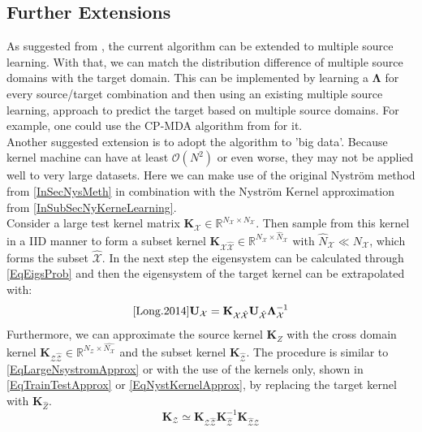 \subsection{Further Extensions}\label{InSubSecFExt}
As suggested from \cite{Long.2015}, the current algorithm can be extended to multiple source learning.
With that, we can match the distribution difference of multiple source domains with the target domain.
This can be implemented by learning a $\mathbf{\Lambda}$ for every source/target combination and then using an existing multiple source learning, approach to predict the target based on multiple source domains.
For example, one could use the \ac{CP-MDA} algorithm from \cite{Chattopadhyay.2012} for it.\\
Another suggested extension is to adopt the algorithm to 'big data'.
Because kernel machine can have at least $\mathcal{O}(N^2)$ or even worse, they may not be applied well to very large datasets.
Here we can make use of the original Nyström method from \ref{InSecNysMeth} in combination with the Nyström Kernel approximation from \ref{InSubSecNyKerneLearning}.\cite{Long.2015}\\
Consider a large test kernel matrix $\mathbf{K}_\mathcal{X} \in \mathbb{R}^{N_\mathcal{X}\times N_\mathcal{X}}$.
Then sample from this kernel in a \acs{IID} manner to form a subset kernel $\mathbf{K}_\mathcal{X\hat{X}} \in \mathbb{R}^{N_\mathcal{X}\times \hat{N}_\mathcal{X}}$ with $\hat{N}_\mathcal{X} \ll N_\mathcal{X}$, which forms the subset $\mathcal{\hat{X}}$.
In the next step the eigensystem can be calculated through \eqref{EqEigsProb} and then the eigensystem of the target kernel can be extrapolated with:
\begin{equation}\label{EqLargeNsystromApprox}\cite{Long.2014}
	\mathbf{U}_\mathcal{X}=\mathbf{K}_\mathcal{X\hat{X}}\mathbf{U}_\mathcal{\hat{X}}\mathbf{\Lambda}_\mathcal{X}^{-1}
\end{equation}
Furthermore, we can approximate the source kernel $\mathbf{K}_{Z}$ with the  cross domain kernel $\mathbf{K}_{\mathcal{Z\hat{Z}}} \in \mathbb{R}^{N_\mathcal{Z}\times \hat{N_\mathcal{X}}}$ and the subset kernel $\mathbf{K}_\mathcal{\hat{Z}}$.
The procedure is similar to \eqref{EqLargeNsystromApprox} or with the use of the kernels only, shown in \eqref{EqTrainTestApprox} or \eqref{EqNystKernelApprox}, by replacing the target kernel with $\mathbf{K}_{\hat{Z}}$.
\begin{equation}
		\mathbf{K}_\mathcal{Z} \simeq	\mathbf{K}_{\mathcal{Z\hat{Z}}}\mathbf{K}_\mathcal{\hat{Z}}^{-1}\mathbf{K}_{\mathcal{\hat{Z}Z}}
\end{equation}
